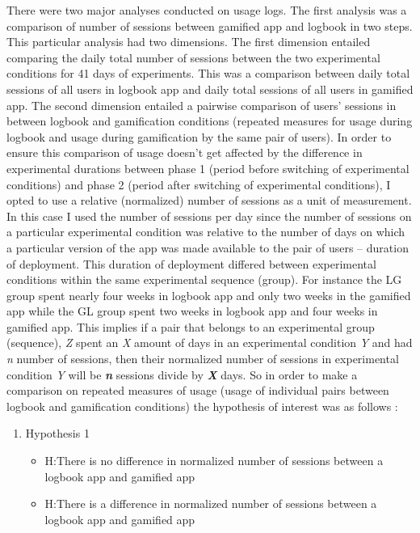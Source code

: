 There were two major analyses conducted on usage logs. The first analysis was a comparison of number of sessions between gamified app and logbook in two steps. This particular analysis had two dimensions.  The first dimension entailed comparing the daily total number of sessions between the two experimental conditions for 41 days of experiments. This was a comparison between daily total sessions of all users in logbook app and daily total sessions of all users in gamified app. The second dimension entailed a pairwise comparison of users' sessions in between logbook and gamification conditions (repeated measures for usage during logbook and usage during gamification by the same pair of users). In order to ensure this comparison of usage doesn't get affected by the difference in experimental durations between phase 1 (period before switching of experimental conditions) and phase 2 (period after switching of experimental conditions), I opted to use a relative (normalized) number of sessions  as a unit of measurement. In this case I used the number of sessions per day since the number of sessions on a particular experimental condition was relative to the number of days on which a particular version of the app was made available to the pair of users -- duration of deployment. This duration of deployment differed between experimental conditions within the same experimental sequence (group). For instance the LG group spent nearly four weeks in logbook app and only two weeks in the gamified app while the GL group spent two weeks in logbook app and four weeks in gamified app. This implies if a pair that belongs to an experimental group (sequence), \emph{Z} spent an \emph{X} amount of days in an experimental condition \emph{Y} and had \emph{n} number of sessions, then their normalized number of sessions in experimental condition \emph{Y} will be \emph{\textbf{n}} sessions divide by \emph{\textbf{X}} days. So in order to make a comparison on repeated measures of usage (usage of individual pairs between logbook and gamification conditions) the hypothesis of interest was as follows :

\begin{enumerate}
\item{Hypothesis 1}
\begin{itemize}
\item{H}:There is no difference in normalized number of sessions between a logbook app and gamified app
\item{H}:There is a difference in normalized number of sessions between a logbook app and gamified app
\end{itemize}
\end{enumerate}

